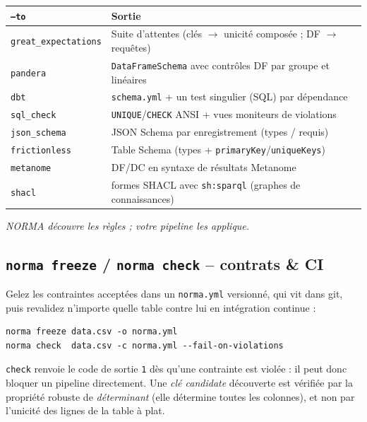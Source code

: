 \documentclass[11pt,a4paper]{article}
\newcommand{\code}[1]{\texttt{#1}}
\begin{document}
\begin{center}
\begin{tabular}{@{}ll@{}}
\toprule
\code{--to} & Sortie \\
\midrule
\code{great\_expectations} & Suite d'attentes (clés $\to$ unicité composée ; DF $\to$ requêtes) \\
\code{pandera}             & \code{DataFrameSchema} avec contrôles DF par groupe et linéaires \\
\code{dbt}                 & \code{schema.yml} + un test singulier (SQL) par dépendance \\
\code{sql\_check}          & \code{UNIQUE}/\code{CHECK} ANSI + vues moniteurs de violations \\
\code{json\_schema}        & JSON Schema par enregistrement (types / requis) \\
\code{frictionless}        & Table Schema (types + \code{primaryKey}/\code{uniqueKeys}) \\
\code{metanome}            & DF/DC en syntaxe de résultats Metanome \\
\code{shacl}               & formes SHACL avec \code{sh:sparql} (graphes de connaissances) \\
\bottomrule
\end{tabular}
\end{center}

\noindent\emph{NORMA découvre les règles ; votre pipeline les applique.}

\subsection{\code{norma freeze} / \code{norma check} -- contrats \& CI}
Gelez les contraintes acceptées dans un \code{norma.yml} versionné, qui vit dans git, puis
revalidez n'importe quelle table contre lui en intégration continue :
\begin{lstlisting}
norma freeze data.csv -o norma.yml
norma check  data.csv -c norma.yml --fail-on-violations
\end{lstlisting}
\code{check} renvoie le code de sortie \code{1} dès qu'une contrainte est violée : il peut
donc bloquer un pipeline directement. Une \emph{clé candidate} découverte est vérifiée par
la propriété robuste de \emph{déterminant} (elle détermine toutes les colonnes), et non par
l'unicité des lignes de la table à plat.
\end{document}
